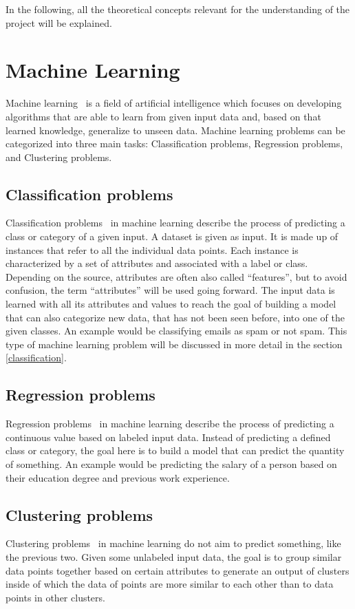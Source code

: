 
In the following, all the theoretical concepts relevant for the understanding of the project will be explained.

\section{Machine Learning}
Machine learning~\cite{machine_learning} is a field of artificial intelligence which focuses on developing algorithms that are able to learn from given input data and, based on that learned knowledge, generalize to unseen data. Machine learning problems can be categorized into three main tasks: Classification problems, Regression problems, and Clustering problems.

\subsection{Classification problems} \label{classification_problems}
Classification problems~\cite{classification_regression} in machine learning describe the process of predicting a class or category of a given input. A dataset is given as input. It is made up of instances that refer to all the individual data points. Each instance is characterized by a set of attributes and associated with a label or class. Depending on the source, attributes are often also called ``features'', but to avoid confusion, the term ``attributes'' will be used going forward. The input data is learned with all its attributes and values to reach the goal of building a model that can also categorize new data, that has not been seen before, into one of the given classes.  An example would be classifying emails as spam or not spam. This type of machine learning problem will be discussed in more detail in the section \ref{classification}.

\subsection{Regression problems}
Regression problems~\cite{classification_regression} in machine learning describe the process of predicting a continuous value based on labeled input data. Instead of predicting a defined class or category, the goal here is to build a model that can predict the quantity of something. An example would be predicting the salary of a person based on their education degree and previous work experience.

\subsection{Clustering problems}
Clustering problems~\cite{clustering} in machine learning do not aim to predict something, like the previous two. Given some unlabeled input data, the goal is to group similar data points together based on certain attributes to generate an output of clusters inside of which the data of points are more similar to each other than to data points in other clusters.

